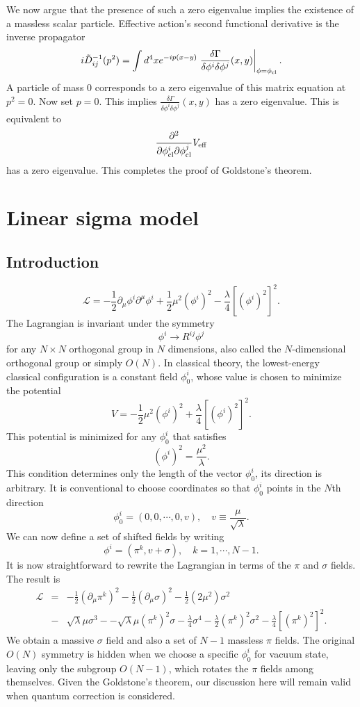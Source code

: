 \begin{newproof}
We now argue that the presence of such a zero eigenvalue implies the existence of a massless scalar particle. Effective action's second functional derivative is the inverse propagator
\[i\tilde{D}_{ij}^{-1}(p^2) = \int d^4x e^{-ip(x-y)} \left. \frac{\delta \Gamma}{\delta \phi^i \delta \phi^j}(x,y) \right|_{\phi = \phi_{\rm cl}}.\]
A particle of mass $0$ corresponds to a zero eigenvalue of this matrix equation at $p^2 = 0$. Now set $p=0$. This implies $\frac{\delta \Gamma}{\delta \phi^i \delta \phi^j}(x,y)$ has a zero eigenvalue. This is equivalent to 
\[\frac{\partial^2}{\partial \phi^i_{\mathrm{cl}} \partial \phi^j_{\mathrm{cl}}}V_{\rm eff}\]
has a zero eigenvalue. This completes the proof of Goldstone's theorem.
\end{newproof}

\section{Linear sigma model}
\subsection{Introduction}
\[\mathcal{L} = -\frac{1}{2} \partial_{\mu} \phi^i \partial^{\mu}\phi^i + \frac{1}{2} \mu^2 (\phi^i)^2 - \frac{\lambda}{4} [(\phi^i)^2]^2.\]
The Lagrangian is invariant under the symmetry
\[\phi^i \to R^{ij} \phi^j\]
for any $N \times N$ orthogonal group in $N$ dimensions, also called the $N$-dimensional orthogonal group or simply $O(N)$. In classical theory, the lowest-energy classical configuration is a constant field $\phi_0^i$, whose value is chosen to minimize the potential
\[V = -\frac{1}{2}\mu^2 (\phi^i)^2 + \frac{\lambda}{4}[(\phi^i)^2]^2.\]
This potential is minimized for any $\phi_0^i$ that satisfies
\[(\phi^i)^2 = \frac{\mu^2}{\lambda} .\]
This condition determines only the length of the vector $\phi_0^i$, its direction is arbitrary. 
It is conventional to choose coordinates so that $\phi_0^i$ points in the $N$th direction
\[\phi_0^i = (0,0,\cdots,0,v) , \quad v \equiv \frac{\mu}{\sqrt{\lambda}}.\]
We can now define a set of shifted fields by writing
\[\phi^i = (\pi^k,v+\sigma) , \quad k = 1,\cdots,N-1.\]
It is now straightforward to rewrite the Lagrangian in terms of the $\pi$ and $\sigma$ fields. The result is
\begin{eqnarray}
\mathcal{L} &=& -\frac{1}{2}(\partial_{\mu}\pi^k)^2 - \frac{1}{2}(\partial_{\mu}\sigma)^2 - \frac{1}{2}(2\mu^2)\sigma^2 \nonumber \\
&-& \sqrt{\lambda}\mu \sigma^3 - -\sqrt{\lambda}\mu (\pi^k)^2\sigma - \frac{\lambda}{4}\sigma^4 - \frac{\lambda}{2}(\pi^k)^2\sigma^2 - \frac{\lambda}{4}[(\pi^k)^2]^2 .\nonumber
\end{eqnarray}
We obtain a massive $\sigma$ field and also a set of $N-1$ massless $\pi$ fields. The original $O(N)$ symmetry is hidden when we choose a specific $\phi_0^i$ for vacuum state, leaving only the subgroup $O(N-1)$, which rotates the $\pi$ fields among themselves. Given the Goldstone's theorem, our discussion here will remain valid when quantum correction is considered.


